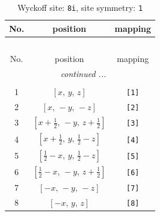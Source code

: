 \documentclass[fleqn,8pt]{jsarticle}
\begin{document}
\renewcommand{\arraystretch}{1.2}
\begin{longtable}{ccc}
\caption{Wyckoff site: {\tt 8i}, site symmetry: {\tt 1}}
 \\
 \hline \hline
No. & position & mapping \\ \hline \endfirsthead

\multicolumn{2}{l}{\tablename\ \thetable{}} \\
 \hline \hline
No. & position & mapping \\ \hline \endhead

 \hline \hline
\multicolumn{2}{r}{\footnotesize\it continued ...} \\ \endfoot

 \hline \hline
\multicolumn{2}{r}{} \\ \endlastfoot

1 & $\left[ x,\, y,\, z \right]$ & {\tt [1]} \\ \hline
2 & $\left[ x,\, - y,\, - z \right]$ & {\tt [2]} \\ \hline
3 & $\left[ x + \frac{1}{2},\, - y,\, z + \frac{1}{2} \right]$ & {\tt [3]} \\ \hline
4 & $\left[ x + \frac{1}{2},\, y,\, \frac{1}{2} - z \right]$ & {\tt [4]} \\ \hline
5 & $\left[ \frac{1}{2} - x,\, y,\, \frac{1}{2} - z \right]$ & {\tt [5]} \\ \hline
6 & $\left[ \frac{1}{2} - x,\, - y,\, z + \frac{1}{2} \right]$ & {\tt [6]} \\ \hline
7 & $\left[ - x,\, - y,\, - z \right]$ & {\tt [7]} \\ \hline
8 & $\left[ - x,\, y,\, z \right]$ & {\tt [8]} \\
\end{longtable}
\end{document}
